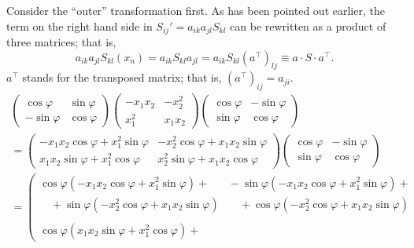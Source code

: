 {Consider the ``outer'' transformation first.
As has been pointed out earlier,
the term on the right hand side in $
S_{ij}'= a_{ik}a_{jl}S_{kl}
$
can be rewritten as a product of three matrices; that is,
$$
a_{ik}a_{jl}S_{kl}\left(x_n\right)
=  a_{ik}S_{kl}a_{jl}
=  a_{ik}S_{kl}\left(a^\intercal  \right)_{lj}
\equiv a\cdot S\cdot a^\intercal  .
$$
$a^\intercal $ stands for the transposed matrix; that is,
$(a^\intercal )_{ij}=a_{ji}$.
\begin{equation}
\begin{split}
  \left(
    \begin{array}{cc}
      \cos \varphi  & \sin \varphi \\
      -\sin \varphi & \cos \varphi
    \end{array}
  \right)
  \left(
    \begin{array}{cc}
      -x_1x_2 & -x_2^2 \\
      x_1^2   & x_1x_2
    \end{array}
  \right)
  \left(
    \begin{array}{cc}
      \cos \varphi  & -\sin \varphi \\
      \sin \varphi & \cos \varphi
    \end{array}
  \right)
\\
  =\left(
    \begin{array}{cc}
      -x_1 x_2 \cos \varphi + x_1^2 \sin \varphi &
        -x_2^2 \cos \varphi + x_1 x_2 \sin \varphi \\
      x_1 x_2 \sin \varphi + x_1^2 \cos \varphi &
        x_2^2 \sin \varphi + x_1 x_2 \cos \varphi
    \end{array}
  \right)
  \left(
    \begin{array}{cc}
      \cos \varphi  & -\sin \varphi \\
      \sin \varphi & \cos \varphi
    \end{array}
  \right)
\\
  =\left(\!\!\!
    \begin{array}{cc}
      \cos \varphi
        \left(-x_1 x_2 \cos \varphi + x_1^2 \sin \varphi\right)+\!&\!
      -\sin \varphi
        \left(-x_1 x_2 \cos \varphi + x_1^2 \sin \varphi\right)+\\
      \quad +\sin \varphi
        \left(-x_2^2 \cos \varphi + x_1 x_2 \sin \varphi\right)\!&\!
      \quad +\cos \varphi
        \left(-x_2^2 \cos \varphi + x_1 x_2 \sin \varphi\right)\\
      \\[1ex]
      \cos \varphi
        \left(x_1 x_2 \sin \varphi + x_1^2 \cos \varphi\right)+\!&\!

\end{array}
\end{split}
\end{equation}}
